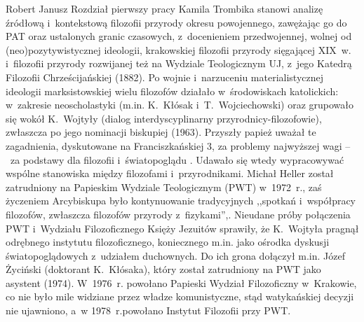 \begin{newrevplenv}{Robert Janusz}
Rozdział pierwszy pracy Kamila Trombika stanowi analizę źródłową i~kontekstową filozofii przyrody okresu powojennego, zawężając go do PAT oraz ustalonych granic czasowych, z~docenieniem przedwojennej, wolnej od (neo)pozytywistycznej ideologii, krakowskiej filozofii przyrody sięgającej XIX~w. i~filozofii przyrody rozwijanej też na Wydziale Teologicznym UJ, z~jego Katedrą Filozofii Chrześcijańskiej (1882). Po wojnie i~narzuceniu materialistycznej ideologii marksistowskiej wielu filozofów działało w~środowiskach katolickich: w~zakresie neoscholastyki (m.in. K.~Kłósak i~T.~Wojciechowski) oraz grupowało się wokół K.~Wojtyły (dialog interdyscyplinarny przyrodnicy-filozofowie), zwłaszcza po jego nominacji biskupiej (1963). Przyszły papież uważał te zagadnienia, dyskutowane na Franciszkańskiej 3, za problemy najwyższej wagi --~za podstawy dla filozofii i~światopoglądu
\parencite[][s.~71–73, 83–84]{trombik_koncepcje_2021}. %
 Udawało się wtedy wypracowywać wspólne stanowiska między filozofami i~przyrodnikami. Michał Heller został zatrudniony na Papieskim Wydziale Teologicznym (PWT) w~1972~r., zaś życzeniem Arcybiskupa było kontynuowanie tradycyjnych ,,spotkań i~współpracy filozofów, zwłaszcza filozofów przyrody z~fizykami'',. Nieudane próby połączenia PWT i~Wydziału Filozoficznego Księży Jezuitów sprawiły, że K.~Wojtyła pragnął odrębnego instytutu filozoficznego, koniecznego m.in. jako ośrodka dyskusji światopoglądowych z~udziałem duchownych. Do ich grona dołączył m.in. Józef Życiński (doktorant K.~Kłósaka), który został zatrudniony na PWT jako asystent (1974). W~1976~r. powołano Papieski Wydział Filozoficzny w~Krakowie, co nie było mile widziane przez władze komunistyczne, stąd watykańskiej decyzji nie ujawniono, a~w 1978~r.powołano Instytut Filozofii przy PWT.


\end{newrevplenv}
